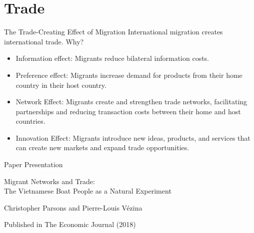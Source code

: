 \documentclass{beamer}
\begin{document}
\section{Trade}
\begin{frame}{The Trade-Creating Effect of Migration}
International migration creates international trade. Why? \pause 
\begin{itemize} \small
    \item Information effect: Migrants reduce bilateral information costs. %
    \item Preference effect: Migrants increase demand for products from their home country in their host country. %
    \item Network Effect: Migrants create and strengthen trade networks, facilitating partnerships and reducing transaction costs between their home and host countries. %
    \item Innovation Effect: Migrants introduce new ideas, products, and services that can create new markets and expand trade opportunities. %
\end{itemize}
\end{frame}

\begin{frame}{Paper Presentation}
\centering
\begin{Large}
    Migrant Networks and Trade: \\ The Vietnamese Boat People as a Natural Experiment \\
\end{Large}
\begin{large}
    Christopher Parsons and Pierre-Louis Vézina \\
\end{large}
Published in The Economic Journal (2018)
\end{frame}
\end{document}
